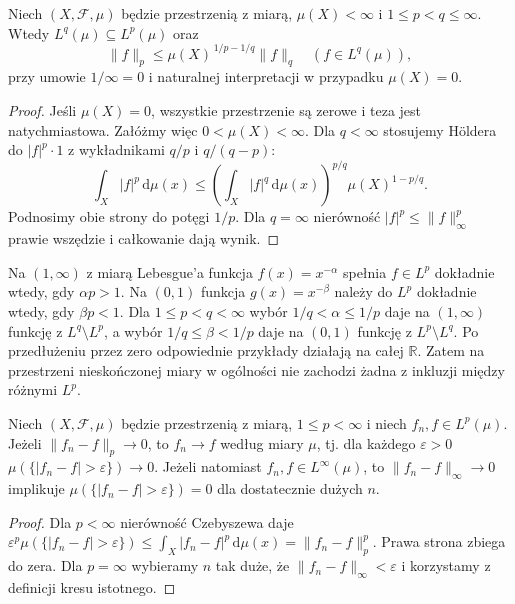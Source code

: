 \begin{twierdzenie}
\label{thm:lp-embedding-finite-14}
Niech $(X,\mathcal F,\mu)$ będzie przestrzenią z miarą,
$\mu(X)<\infty$ i $1\le p<q\le\infty$.
Wtedy $L^q(\mu)\subseteq L^p(\mu)$ oraz
\begin{equation}\label{eq:finite-embedding-14}
\|f\|_p\le\mu(X)^{\,1/p-1/q}\|f\|_q
\quad(f\in L^q(\mu)),
\end{equation}
przy umowie $1/\infty=0$ i naturalnej interpretacji
w przypadku $\mu(X)=0$.
\end{twierdzenie}
\begin{proof}
Jeśli $\mu(X)=0$, wszystkie przestrzenie są
zerowe i teza jest natychmiastowa. Załóżmy więc
$0<\mu(X)<\infty$.
Dla $q<\infty$ stosujemy Höldera do
$|f|^p\cdot1$ z wykładnikami $q/p$ i $q/(q-p)$:
\[
\int_X|f|^p\,\mathrm d\mu(x)
\le\left(\int_X|f|^q\,\mathrm d\mu(x)\right)^{p/q}
\mu(X)^{1-p/q}.
\]
Podnosimy obie strony do potęgi $1/p$.
Dla $q=\infty$ nierówność
$|f|^p\le\|f\|_\infty^p$ prawie wszędzie
i całkowanie dają wynik.
\end{proof}

\begin{przyklad}
Na $(1,\infty)$ z miarą Lebesgue'a
funkcja $f(x)=x^{-\alpha}$ spełnia
$f\in L^p$ dokładnie wtedy, gdy $\alpha p>1$.
Na $(0,1)$ funkcja $g(x)=x^{-\beta}$
należy do $L^p$ dokładnie wtedy, gdy $\beta p<1$.
Dla $1\le p<q<\infty$ wybór
$1/q<\alpha\le1/p$ daje na $(1,\infty)$
funkcję z $L^q\setminus L^p$,
a wybór $1/q\le\beta<1/p$ daje na $(0,1)$
funkcję z $L^p\setminus L^q$.
Po przedłużeniu przez zero odpowiednie przykłady
działają na całej $\mathbb R$.
Zatem na przestrzeni nieskończonej miary
w ogólności nie zachodzi żadna z inkluzji między
różnymi $L^p$.
\end{przyklad}

\begin{twierdzenie}
\label{thm:lp-to-measure-14}
Niech $(X,\mathcal F,\mu)$ będzie przestrzenią z miarą,
$1\le p<\infty$ i niech $f_n,f\in L^p(\mu)$.
Jeżeli $\|f_n-f\|_p\to0$, to $f_n\to f$
według miary $\mu$, tj. dla każdego $\varepsilon>0$
$\mu(\{|f_n-f|>\varepsilon\})\to0$.
Jeżeli natomiast $f_n,f\in L^\infty(\mu)$, to
$\|f_n-f\|_\infty\to0$ implikuje
$\mu(\{|f_n-f|>\varepsilon\})=0$ dla dostatecznie
dużych $n$.
\end{twierdzenie}
\begin{proof}
Dla $p<\infty$ nierówność Czebyszewa daje
$\varepsilon^p\mu(\{|f_n-f|>\varepsilon\})
\le\int_X|f_n-f|^p\,\mathrm d\mu(x)=\|f_n-f\|_p^p$.
Prawa strona zbiega do zera.
Dla $p=\infty$ wybieramy $n$ tak duże, że
$\|f_n-f\|_\infty<\varepsilon$ i korzystamy
z definicji kresu istotnego.
\end{proof}

